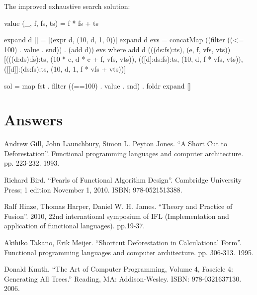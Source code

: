 \documentclass[b5paper]{article}
\begin{document}
The improved exhaustive search solution:

\begin{Haskell}
value (_, f, fs, ts) = f * fs + ts

expand d [] = [(expr d, (10, d, 1, 0))]
expand d evs = concatMap ((filter ((<= 100) . value . snd)) . (add d)) evs
where
  add d (((ds:fs):ts), (e, f, vfs, vts)) =
    [(((d:ds):fs):ts, (10 * e, d * e + f, vfs, vts)),
     (([d]:ds:fs):ts, (10, d, f * vfs, vts)),
     ([[d]]:(ds:fs):ts, (10, d, 1, f * vfs + vts))]

sol = map fst . filter ((==100) . value . snd) . foldr expand []
\end{Haskell}

\ifx\wholebook\relax \else
\section{Answers}
\shipoutAnswer

\begin{thebibliography}{99}

Andrew Gill, John Launchbury, Simon L. Peyton Jones. ``A Short Cut to Deforestation''. Functional programming languages and computer architecture. pp. 223-232. 1993.

Richard Bird. ``Pearls of Functional Algorithm Design''. Cambridge University Press; 1 edition November 1, 2010. ISBN: 978-0521513388.

Ralf Hinze, Thomas Harper, Daniel W. H. James. ``Theory and Practice of Fusion''. 2010, 22nd international symposium of IFL (Implementation and application of functional languages). pp.19-37.

Akihiko Takano, Erik Meijer. ``Shortcut Deforestation in Calculational Form''. Functional programming languages and computer architecture. pp. 306-313. 1995.

Donald Knuth. ``The Art of Computer Programming, Volume 4, Fascicle 4: Generating All Trees.'' Reading, MA: Addison-Wesley. ISBN: 978-0321637130. 2006.

\end{thebibliography}

\expandafter\enddocument

\fi
\end{document}
